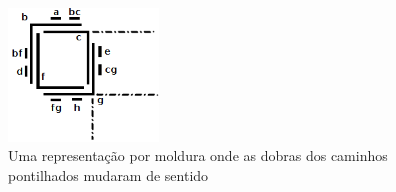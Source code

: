 \begin{figure}[htb]	
\center%
\includegraphics[width=4cm]{./img/outraRepresentacaoFrame3.png}
\caption{Uma representação por moldura onde as dobras dos caminhos pontilhados mudaram de sentido}
\label{fig:outraRepresentacaoFrame}
\end{figure}